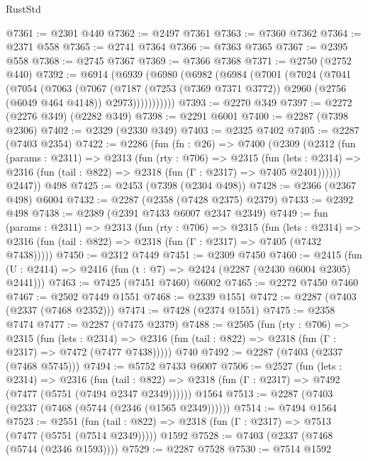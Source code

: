\begin{lexlean}{RustStd}
\begin{coremodule}
@7361 := @2301 @440
@7362 := @2497 @7361
@7363 := @7360 @7362
@7364 := @2371 @558
@7365 := @2741 @7364
@7366 := @7363 @7365
@7367 := @2395 @558
@7368 := @2745 @7367
@7369 := @7366 @7368
@7371 := @2750 (@2752 @440)
@7392 := @6914
    (@6939
      (@6980
        (@6982
          (@6984
            (@7001
              (@7024
                (@7041
                  (@7054
                    (@7063
                      (@7067
                        (@7187
                          (@7253 (@7369 @7371 @3772))
                          @2960
                          (@2756 (@6049 @464 @4148))
                          @2973)))))))))))
@7393 := @2270 @349
@7397 := @2272 (@2276 @349) (@2282 @349)
@7398 := @2291 @6001
@7400 := @2287 (@7398 @2306)
@7402 := @2329 (@2330 @349)
@7403 := @2325 @7402
@7405 := @2287 (@7403 @2354)
@7422 := @2286
    (fun (fn : @26) =>
    @7400
      (@2309
        (@2312
          (fun (params : @2311) =>
          @2313
            (fun (rty : @706) =>
            @2315
              (fun (lets : @2314) =>
              @2316 (fun (tail : @822) => @2318 (fun (Γ : @2317) => @7405 @2401))))))
        @2447))
    @498
@7425 := @2453 (@7398 (@2304 @498))
@7428 := @2366 (@2367 @498) @6004
@7432 := @2287 (@2358 (@7428 @2375) @2379)
@7433 := @2392 @498
@7438 := @2389 (@2391 @7433 @6007 @2347 @2349)
@7449 := fun (params : @2311) =>
  @2313
    (fun (rty : @706) =>
    @2315
      (fun (lets : @2314) =>
      @2316 (fun (tail : @822) => @2318 (fun (Γ : @2317) => @7405 (@7432 @7438)))))
@7450 := @2312 @7449
@7451 := @2309 @7450
@7460 := @2415 (fun (U : @2414) => @2416 (fun (t : @7) => @2424 (@2287 (@2430 @6004 @2305) @2441)))
@7463 := @7425 (@7451 @7460) @6002
@7465 := @2272 @7450 @7460
@7467 := @2502 @7449 @1551
@7468 := @2339 @1551
@7472 := @2287 (@7403 (@2337 (@7468 @2352)))
@7474 := @7428 (@2374 @1551)
@7475 := @2358 @7474
@7477 := @2287 (@7475 @2379)
@7488 := @2505
    (fun (rty : @706) =>
    @2315
      (fun (lets : @2314) =>
      @2316 (fun (tail : @822) => @2318 (fun (Γ : @2317) => @7472 (@7477 @7438)))))
    @740
@7492 := @2287 (@7403 (@2337 (@7468 @5745)))
@7494 := @5752 @7433 @6007
@7506 := @2527
    (fun (lets : @2314) =>
    @2316
      (fun (tail : @822) => @2318 (fun (Γ : @2317) => @7492 (@7477 (@5751 (@7494 @2347 @2349))))))
    @1564
@7513 := @2287 (@7403 (@2337 (@7468 (@5744 (@2346 (@1565 @2349))))))
@7514 := @7494 @1564
@7523 := @2551
    (fun (tail : @822) => @2318 (fun (Γ : @2317) => @7513 (@7477 (@5751 (@7514 @2349)))))
    @1592
@7528 := @7403 (@2337 (@7468 (@5744 (@2346 @1593))))
@7529 := @2287 @7528
@7530 := @7514 @1592

\end{coremodule}
\end{lexlean}
